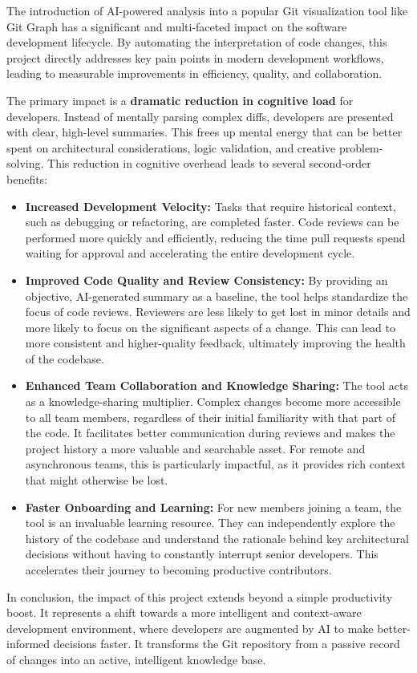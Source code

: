 The introduction of AI-powered analysis into a popular Git visualization tool like Git Graph has a significant and multi-faceted impact on the software development lifecycle. By automating the interpretation of code changes, this project directly addresses key pain points in modern development workflows, leading to measurable improvements in efficiency, quality, and collaboration.

The primary impact is a \textbf{dramatic reduction in cognitive load} for developers. Instead of mentally parsing complex diffs, developers are presented with clear, high-level summaries. This frees up mental energy that can be better spent on architectural considerations, logic validation, and creative problem-solving. This reduction in cognitive overhead leads to several second-order benefits:

\begin{itemize}
    \item \textbf{Increased Development Velocity:} Tasks that require historical context, such as debugging or refactoring, are completed faster. Code reviews can be performed more quickly and efficiently, reducing the time pull requests spend waiting for approval and accelerating the entire development cycle.
    
    \item \textbf{Improved Code Quality and Review Consistency:} By providing an objective, AI-generated summary as a baseline, the tool helps standardize the focus of code reviews. Reviewers are less likely to get lost in minor details and more likely to focus on the significant aspects of a change. This can lead to more consistent and higher-quality feedback, ultimately improving the health of the codebase.
    
    \item \textbf{Enhanced Team Collaboration and Knowledge Sharing:} The tool acts as a knowledge-sharing multiplier. Complex changes become more accessible to all team members, regardless of their initial familiarity with that part of the code. It facilitates better communication during reviews and makes the project history a more valuable and searchable asset. For remote and asynchronous teams, this is particularly impactful, as it provides rich context that might otherwise be lost.
    
    \item \textbf{Faster Onboarding and Learning:} For new members joining a team, the tool is an invaluable learning resource. They can independently explore the history of the codebase and understand the rationale behind key architectural decisions without having to constantly interrupt senior developers. This accelerates their journey to becoming productive contributors.
\end{itemize}

In conclusion, the impact of this project extends beyond a simple productivity boost. It represents a shift towards a more intelligent and context-aware development environment, where developers are augmented by AI to make better-informed decisions faster. It transforms the Git repository from a passive record of changes into an active, intelligent knowledge base. 